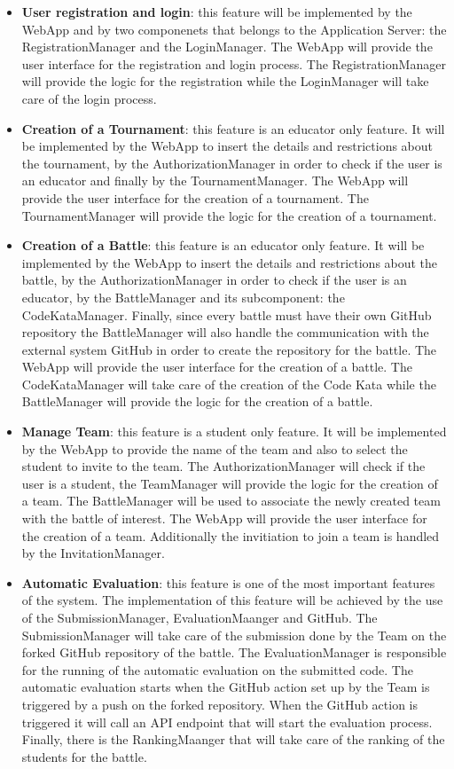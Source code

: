 \begin{itemize}
    \item \textbf{User registration and login}: this feature will be implemented by the WebApp and by two componenets that belongs to the Application Server: the RegistrationManager and the LoginManager. The WebApp will provide the user interface for the registration and login process. The RegistrationManager will provide the logic for the registration while the LoginManager will take care of the login process.
    \item \textbf{Creation of a Tournament}: this feature is an educator only feature. It will be implemented by the WebApp to insert the details and restrictions about the tournament, by the AuthorizationManager in order to check if the user is an educator and finally by the TournamentManager. The WebApp will provide the user interface for the creation of a tournament. The TournamentManager will provide the logic for the creation of a tournament.
    \item \textbf{Creation of a Battle}: this feature is an educator only feature. It will be implemented by the WebApp to insert the details and restrictions about the battle, by the AuthorizationManager in order to check if the user is an educator, by the BattleManager and its subcomponent: the CodeKataManager. Finally, since every battle must have their own GitHub repository the BattleManager will also handle the communication with the external system GitHub in order to create the repository for the battle. The WebApp will provide the user interface for the creation of a battle. The CodeKataManager will take care of the creation of the Code Kata while the BattleManager will provide the logic for the creation of a battle.
    \item \textbf{Manage Team}: this feature is a student only feature. It will be implemented by the WebApp to provide the name of the team and also to select the student to invite to the team. The AuthorizationManager will check if the user is a student, the TeamManager will provide the logic for the creation of a team. The BattleManager will be used to associate the newly created team with the battle of interest. The WebApp will provide the user interface for the creation of a team. Additionally the invitiation to join a team is handled by the InvitationManager.
    \item \textbf{Automatic Evaluation}: this feature is one of the most important features of the system. The implementation of this feature will be achieved by the use of the SubmissionManager, EvaluationMaanger and GitHub. The SubmissionManager will take care of the submission done by the Team on the forked GitHub repository of the battle. The EvaluationManager is responsible for the running of the automatic evaluation on the submitted code. The automatic evaluation starts when the GitHub action set up by the Team is triggered by a push on the forked repository. When the GitHub action is triggered it will call an API endpoint that will start the evaluation process. Finally, there is the RankingMaanger that will take care of the ranking of the students for the battle.

\end{itemize}
